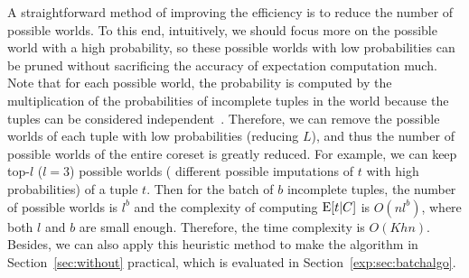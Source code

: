 A straightforward method of improving the efficiency is to reduce the number of possible worlds. To this end, intuitively, we should focus more on the possible world with a high probability, so these possible worlds with low probabilities can be pruned without sacrificing the accuracy of expectation computation much. Note that for each possible world, the probability is computed by the multiplication of the probabilities of incomplete tuples in the  world because the tuples can be considered independent~\cite{miao2022experimental}. Therefore,  we can remove the possible worlds of each tuple with low probabilities (\ie  reducing $L$), and thus the number of possible worlds of the entire coreset is greatly reduced. 
For example, we can keep top-$l$ (\eg $l=3$) possible worlds ( different possible imputations of $t$ with high probabilities) of a tuple $t$. Then for the batch of $b$ incomplete tuples, the number of possible worlds is $l^b$ and the complexity of computing $\mathrm{E}[t|C]$ is $O(nl^b)$, where both $l$ and $b$ are small enough. Therefore, the time complexity is $O(Khn)$. Besides, we can also apply this heuristic method to make the algorithm in Section~\ref{sec:without} practical, which is evaluated in Section~\ref{exp:sec:batchalgo}.



























